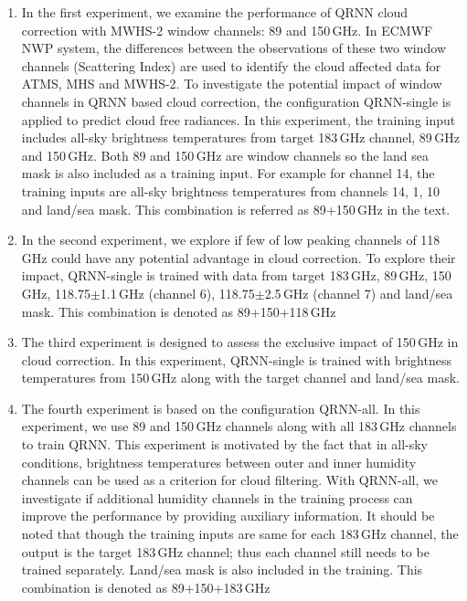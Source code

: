 \documentclass[amt]{copernicus}
\begin{document}
\begin{enumerate}
	
	\item In the first experiment, we examine the performance of QRNN cloud correction with MWHS-2 window channels: 89 and 150\,GHz. In ECMWF NWP system, the differences between the observations of these two window channels (Scattering Index) \citep{Lu2015FY3C} are used to identify the cloud affected data for ATMS, MHS and MWHS-2. To investigate the potential impact of window channels in QRNN based cloud correction, the configuration QRNN-single is applied to predict cloud free radiances. In this experiment, the training input includes all-sky brightness temperatures from target 183\,GHz channel, 89\,GHz and 150\,GHz. Both 89 and 150\,GHz are window channels so the land sea mask is also included as a training input. For example for channel 14, the training inputs are all-sky brightness temperatures from channels 14, 1, 10 and land/sea mask. This combination is referred as 89+150\,GHz in the text.
	
	\item In the second experiment, we explore if few of low peaking channels of 118\,GHz could have any potential advantage in cloud correction. To explore their impact, QRNN-single is trained with data from target 183\,GHz, 89\,GHz, 150\,GHz, 118.75$\pm$1.1\,GHz (channel 6), 118.75$\pm$2.5\,GHz (channel 7) and land/sea mask. This combination is denoted as 89+150+118\,GHz
	
	\item The third experiment is designed to assess the exclusive impact of 150\,GHz in cloud correction. In this experiment, QRNN-single is trained with brightness temperatures from 150\,GHz along with the target channel and land/sea mask. 
	
	\item The fourth experiment is based on the configuration QRNN-all. In this experiment, we use 89 and 150\,GHz channels along with all 183\,GHz channels to train QRNN. This experiment is motivated by the fact that in all-sky conditions, brightness temperatures between outer and inner humidity channels can be used as a criterion for cloud filtering\cite{buehler:aclou:07}. With QRNN-all, we investigate if additional humidity channels in the training process can improve the performance by providing auxiliary information. It should be noted that though the training inputs are same for each 183\,GHz channel, the output is the target 183\,GHz channel; thus each channel still needs to be trained separately. Land/sea mask is also included in the training. This combination is denoted as 89+150+183\,GHz
\end{enumerate}
\end{document}
